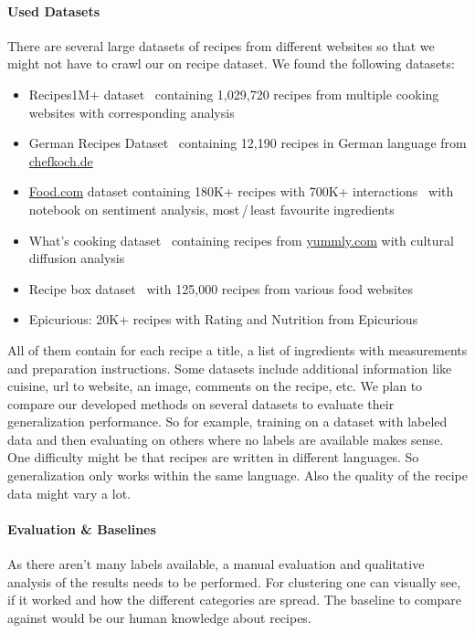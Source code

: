 \documentclass[
     12pt,         %
     a4paper,      %
     BCOR10mm,     %
     DIV14,        %
     ]{article}
\begin{document}
\paragraph{Used Datasets} There are several large datasets of recipes from different websites so that we might not have to crawl our on recipe dataset. We found the following datasets:
\begin{itemize}
  \item Recipes1M+ dataset~\cite{marin2019recipe1m} containing 1,029,720 recipes from multiple cooking websites with corresponding analysis~\cite{8099810}
  \item German Recipes Dataset~\cite{germanrecipesdataset} containing 12,190 recipes in German language from \url{chefkoch.de}
  \item \url{Food.com} dataset containing 180K+ recipes with 700K+ interactions~\cite{foodcominteractions} with notebook on sentiment analysis, most\,/\,least favourite ingredients
  \item What's cooking dataset~\cite{whatscooking} containing recipes from \url{yummly.com} with cultural diffusion analysis~\cite{cultdiffusion}
  \item Recipe box dataset~\cite{recipebox} with 125,000 recipes from various food websites
  \item Epicurious: 20K+ recipes with Rating and Nutrition from Epicurious~\cite{epirecipes}
\end{itemize}
All of them contain for each recipe a title, a list of ingredients with measurements and preparation instructions. Some datasets include additional information like cuisine, url to website, an image, comments on the recipe, etc.
We plan to compare our developed methods on several datasets to evaluate their generalization performance. So for example, training on a dataset with labeled data and then evaluating on others where no labels are available makes sense. One difficulty might be that recipes are written in different languages. So generalization only works within the same language. Also the quality of the recipe data might vary a lot.

\paragraph{Evaluation \& Baselines} As there aren't many labels available, a manual evaluation and qualitative analysis of the results needs to be performed. For clustering one can visually see, if it worked and how the different categories are spread. The baseline to compare against would be our human knowledge about recipes.
\end{document}
